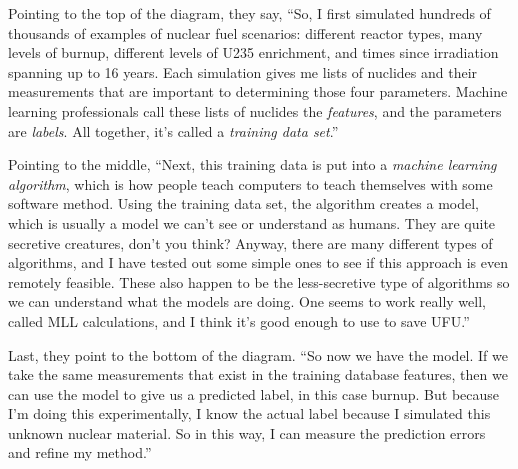{\begin{shadequote}
  Pointing to the top of the diagram, they say, ``So, I first simulated hundreds
  of thousands of examples of nuclear fuel scenarios: different reactor types,
  many levels of burnup, different levels of \gls{U235} enrichment, and times
  since irradiation spanning up to 16 years.  Each simulation gives me lists of
  nuclides and their measurements that are important to determining those four
  parameters.  Machine learning professionals call these lists of nuclides the
  \textit{features}, and the parameters are \textit{labels}. All together, it's
  called a \textit{training data set}.''
  
  Pointing to the middle, ``Next, this training data is put into a
  \textit{machine learning algorithm}\footnotemark[6], which is how people
  teach computers to teach themselves with some software method. Using the
  training data set, the algorithm creates a model, which is usually a model we
  can't see or understand as humans. They are quite secretive creatures, don't
  you think?  Anyway, there are many different types of algorithms, and I have
  tested out some simple ones to see if this approach is even remotely
  feasible. These also happen to be the less-secretive type of algorithms so we
  can understand what the models are doing. One seems to work really well,
  called \gls{MLL} calculations\footnotemark[7], and I think it's good enough
  to use to save UFU.''
  
  Last, they point to the bottom of the diagram. ``So now we have the model. If
  we take the same measurements that exist in the training database features,
  then we can use the model to give us a predicted label, in this case burnup.
  But because I'm doing this experimentally, I know the actual label because I
  simulated this unknown nuclear material. So in this way, I can measure the
  prediction errors and refine my method.''
  
\end{shadequote}

}
